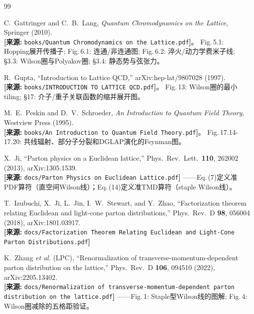 \documentclass[12pt,a4paper]{ctexart}
\begin{document}
\begin{thebibliography}{99}

C.~Gattringer and C.~B.~Lang,
\textit{Quantum Chromodynamics on the Lattice}, Springer (2010).
\\\textbf{[来源:} \texttt{books/Quantum Chromodynamics on the Lattice.pdf}\textbf{]}。
Fig.\,5.1: Hopping展开传播子; Fig.\,6.1: 连通/非连通图; Fig.\,6.2: 淬火/动力学费米子线; §3.3: Wilson圈与Polyakov圈; §3.4: 静态势与弦张力。

R.~Gupta, ``Introduction to Lattice QCD,'' arXiv:hep-lat/9807028 (1997).
\\\textbf{[来源:} \texttt{books/INTRODUCTION TO LATTICE QCD.pdf}\textbf{]}。
Fig.\,13: Wilson圈的最小tiling; §17: 介子/重子关联函数的缩并展开图。

M.~E.~Peskin and D.~V.~Schroeder,
\textit{An Introduction to Quantum Field Theory}, Westview Press (1995).
\\\textbf{[来源:} \texttt{books/An Introduction to Quantum Field Theory.pdf}\textbf{]}。
Fig.\,17.14-17.20: 共线辐射、部分子分裂和DGLAP演化的Feynman图。

X.~Ji, ``Parton physics on a Euclidean lattice,''
Phys.\ Rev.\ Lett.\ \textbf{110}, 262002 (2013), arXiv:1305.1539.
\\\textbf{[来源:} \texttt{docs/Parton Physics on Euclidean Lattice.pdf}\textbf{]}
——Eq.\,(7)定义准PDF算符（直空间Wilson线）；Eq.\,(14)定义准TMD算符（staple Wilson线）。

T.~Izubuchi, X.~Ji, L.~Jin, I.~W.~Stewart, and Y.~Zhao,
``Factorization theorem relating Euclidean and light-cone parton distributions,''
Phys.\ Rev.\ D \textbf{98}, 056004 (2018), arXiv:1801.03917.
\\\textbf{[来源:} \texttt{docs/Factorization Theorem Relating Euclidean and Light-Cone Parton Distributions.pdf}\textbf{]}

K.~Zhang \textit{et al.} (LPC),
``Renormalization of transverse-momentum-dependent parton distribution on the lattice,''
Phys.\ Rev.\ D \textbf{106}, 094510 (2022), arXiv:2205.13402.
\\\textbf{[来源:} \texttt{docs/Renormalization of transverse-momentum-dependent parton distribution on the lattice.pdf}\textbf{]}
——Fig.\,1: Staple型Wilson线的图解; Fig.\,4: Wilson圈减除的五格距验证。


\end{thebibliography}
\end{document}
